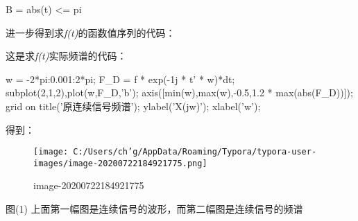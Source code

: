 \documentclass[]{article}
\newenvironment{Shaded}{}{}
\newcommand{\CommentTok}[1]{\textcolor[rgb]{0.38,0.63,0.69}{\textit{#1}}}
\newcommand{\FloatTok}[1]{\textcolor[rgb]{0.25,0.63,0.44}{#1}}
\newcommand{\NormalTok}[1]{#1}
\newcommand{\StringTok}[1]{\textcolor[rgb]{0.25,0.44,0.63}{#1}}
\begin{document}
\begin{Shaded}
\begin{Highlighting}[]
\NormalTok{	B = abs(t) <= pi}
\end{Highlighting}
\end{Shaded}

进一步得到求\emph{f(t)}的函数值序列的代码：

\begin{Shaded}
\end{Shaded}

这是求\emph{f(t)}实际频谱的代码：

\begin{Shaded}
\begin{Highlighting}[]
\NormalTok{	w = -}\FloatTok{2}\NormalTok{*pi:}\FloatTok{0.001}\NormalTok{:}\FloatTok{2}\NormalTok{*pi;}
\NormalTok{	F_D = f * exp(-}\FloatTok{1j}\NormalTok{ * t' * w)*dt; }
\NormalTok{	subplot(}\FloatTok{2}\NormalTok{,}\FloatTok{1}\NormalTok{,}\FloatTok{2}\NormalTok{),plot(w,F_D,}\StringTok{'b'}\NormalTok{);}
\NormalTok{	axis([min(w),max(w),-}\FloatTok{0.5}\NormalTok{,}\FloatTok{1.2}\NormalTok{ * max(abs(F_D))]);  }
\NormalTok{	grid on}
\NormalTok{	title(}\StringTok{'原连续信号频谱'}\NormalTok{);}
\NormalTok{	ylabel(}\StringTok{'X(jw)'}\NormalTok{);}
\NormalTok{	xlabel(}\StringTok{'w'}\NormalTok{);}
\end{Highlighting}
\end{Shaded}

得到：

\begin{figure}
\centering
\texttt{[image: C:/Users/ch'g/AppData/Roaming/Typora/typora-user-images/image-20200722184921775.png]}
\caption{image-20200722184921775}
\end{figure}

图(1) 上面第一幅图是连续信号的波形，而第二幅图是连续信号的频谱
\end{document}
